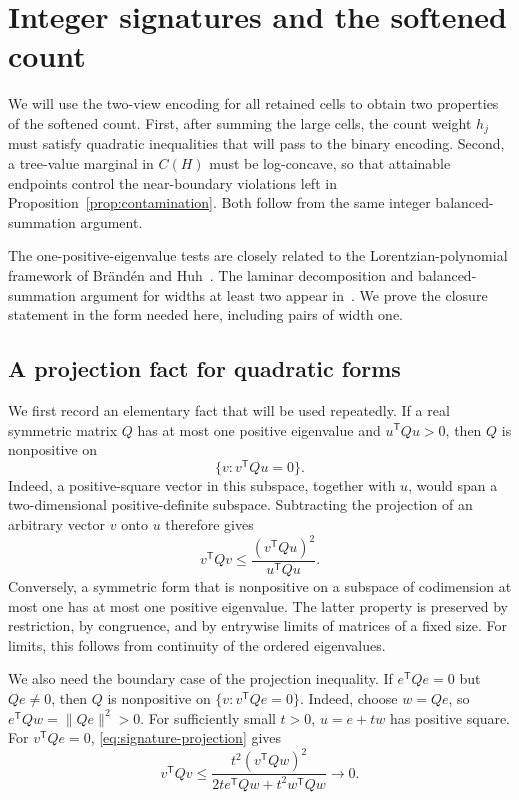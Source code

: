 \section{Integer signatures and the softened count}
\label{sec:integer-signatures}

We will use the two-view encoding for all retained cells to obtain
two properties of the softened count.
First, after summing the large cells, the count weight $h_j$ must satisfy
quadratic inequalities that will pass to the binary encoding.  Second,
a tree-value marginal in $C(H)$ must be log-concave, so that attainable
endpoints control the near-boundary violations left in
Proposition~\ref{prop:contamination}.  Both follow from the same integer
balanced-summation argument.

The one-positive-eigenvalue tests are closely related to the
Lorentzian-polynomial framework of Br\"and\'en and Huh~\cite{BH2020}.
The laminar decomposition and balanced-summation argument for widths
at least two appear in~\cite[Lemmas~3.2--3.3 and Proposition~3.4]{OpenAIExactTables2026}.
We prove the closure statement in the form needed here, including
pairs of width one.

\subsection{A projection fact for quadratic forms}

We first record an elementary fact that will be used repeatedly.
If a real symmetric matrix \(Q\) has at most one positive eigenvalue
and \(u^{\mathsf T}Qu>0\), then \(Q\) is nonpositive on
\[
 \{v:v^{\mathsf T}Qu=0\}.
\]
Indeed, a positive-square vector in this subspace, together with \(u\),
would span a two-dimensional positive-definite subspace.
Subtracting the projection of an arbitrary vector \(v\) onto \(u\)
therefore gives
\begin{equation}
 v^{\mathsf T}Qv
 \le
 \frac{(v^{\mathsf T}Qu)^2}{u^{\mathsf T}Qu}.
 \label{eq:signature-projection}
\end{equation}
Conversely, a symmetric form that is nonpositive on a subspace of
codimension at most one has at most one positive eigenvalue.
The latter property is preserved by restriction, by congruence, and
by entrywise limits of matrices of a fixed size.
For limits, this follows from continuity of the ordered eigenvalues.

We also need the boundary case of the projection inequality.  If
$e^{\mathsf T}Qe=0$ but $Qe\ne0$, then $Q$ is nonpositive on
$\{v:v^{\mathsf T}Qe=0\}$.  Indeed, choose $w=Qe$, so
$e^{\mathsf T}Qw=\|Qe\|^2>0$.  For sufficiently small $t>0$,
$u=e+tw$ has positive square.  For $v^{\mathsf T}Qe=0$,
\eqref{eq:signature-projection} gives
\[
 v^{\mathsf T}Qv
 \le \frac{t^2(v^{\mathsf T}Qw)^2}
 {2t e^{\mathsf T}Qw+t^2w^{\mathsf T}Qw}\longrightarrow0.
\]

